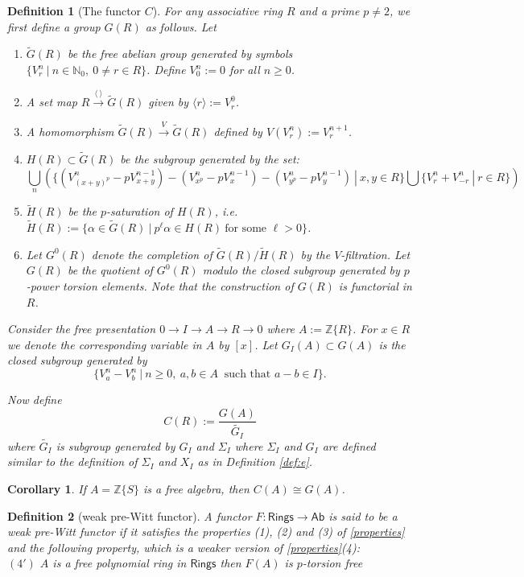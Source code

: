 \documentclass[10pt,a4paper]{amsart}
\newtheorem{definition}{Definition}
\newtheorem{corollary}{Corollary}
\newcommand{\N}{{\mathbb N}}
\newcommand{\Rings}{{\mathsf{Rings}}}
\newcommand{\Union}{\bigcup}
\newcommand{\Z}{{\mathbb Z}}
\newcommand{\ab}[1]{\langle {#1} \rangle}
\renewcommand{\tilde}{\widetilde}
\begin{document}
\begin{definition}[The functor $C$]\label{def:C}
For any associative ring $R$ and a prime $p\neq 2$, we first define a group $G(R)$ as follows. Let 
\begin{enumerate}
\item $\tilde{G}(R)$ be the free abelian group generated by symbols $\{ V^n_r \ | \ n\in \N_0 , \ 0\neq r\in R\}$. Define $V^n_0:=0$ for all $n\geq0$. 
\item A set map $R \xrightarrow{\ab{\ } } \tilde{G}(R)$ given by $\ab{r} := V^0_r$.
\item A homomorphism $\tilde{G}(R) \xrightarrow{V} \tilde{G}(R)$ defined by $V(V^n_r):= V^{n+1}_r$.
\item $H(R)\subset \tilde{G}(R)$ be the subgroup generated by the set: 
$$  \Union_n\left(\{(V^n_{(x+y)^p} - p V^{n-1}_{x+y}) - (V^n_{x^p} - p V^{n-1}_{x}) - (V^n_{y^p} - p V^{n-1}_{y})\ | \ x, y \in R \} \Union \{V^n_r+V^n_{-r} \ | \ r \in R\}\right)$$ 
\item $\tilde{H}(R)$ be the $p$-saturation of $H(R)$, i.e.
$ \tilde{H}(R):= \{ \alpha \in \tilde{G}(R) \ | \ p^\ell \alpha \in H(R) \ \text{for some } \ell >0\}$.
\item Let $G^0(R)$ denote the completion of $\tilde{G}(R)/\tilde{H}(R)$ by the $V$-filtration. Let $G(R)$ be the quotient of $G^0(R)$ modulo the closed subgroup generated by $p$-power torsion elements. Note that the construction of $G(R)$ is functorial in $R$.\\
\end{enumerate}
Consider the free presentation $0 \to I \to A \to R \to 0 $ where $A:=\Z\{R\}$. For $x \in R$ we denote the corresponding variable in $A$ by $[x]$. Let $G_I(A) \subset G(A)$ is the closed subgroup generated by $$\{V^n_a-V^n_b \ | \ n\geq 0,  \ a,b\in A \ \text{ such that } a-b\in I\}.$$

\noindent Now define $$C(R):= \frac{G(A)}{\tilde{G_I}}$$ where $\tilde{G_I}$ is subgroup generated by $G_I$ and $\Sigma_I$ where $\Sigma_I$ and $G_I$ are defined similar to the definition of $\Sigma_I$ and $X_I$ as in Definition \ref{def:e}. 
\end{definition} 

\begin{corollary}\label{ceqg}
If $A=\Z\{S\}$ is a free algebra, then $C(A) \cong G(A)$.
\end{corollary}

\begin{definition}[weak pre-Witt functor]\label{def:weakpre} A functor $F: \Rings \to  \mathsf{Ab}$ is said to be a weak pre-Witt functor if it satisfies the properties (1), (2) and (3) of \ref{properties} and the following property, which is a weaker version of  \ref{properties}(4): \\

$(4')$ $A$ is a free polynomial ring in $\Rings$ then $F(A)$ is $p$-torsion free
\end{definition} 
\end{document}
